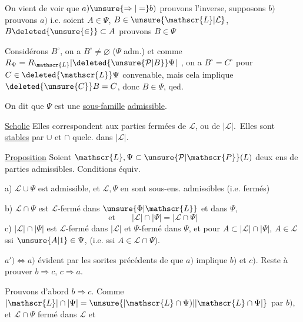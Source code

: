On vient de voir que $a)\unsure{\Rightarrow|=} b)$ prouvons l'inverse, supposons $b)$ prouvons $a)$ i.e. soient $A\in\Psi$, $B\in\unsure{\mathscr{L}|\mathcal{L}}$, $B\deleted{\unsure{\in}}\subset A$ prouvons $B\in\Psi$

Considérons $B^\circ$, on a $B^\circ\ne\varnothing$ ($\Psi$ adm.) et comme $R_\Psi=R_{\mathscr{L}}\lvert\deleted{\unsure{\mathcal{P}|B}}\Psi\rvert$ , on a $B^\circ=C^\circ$ pour $C\in\deleted{\mathscr{L}}\Psi$ convenable, mais cela implique $\deleted{\unsure{C}}B=C$, donc $B\in\Psi$, qed.

On dit que $\Psi$ est une \uline{sous-famille} \uline{admissible}.

\uline{Scholie} Elles correspondent  aux parties fermées de $\mathscr{L}$, ou de $|\mathscr{L}|$. \unsure{\ensuremath{\Rightarrow}|=}\,Elles sont \uline{stables} par $\cup$ et $\cap$ quelc. dans $|\mathscr{L}|$.

\uline{Proposition} Soient $\mathscr{L},\Psi\subset\unsure{\mathcal{P}|\mathscr{P}}(L)$ deux ens de parties admissibles. Conditions équiv.

a) $\mathscr{L}\cup\Psi$ est admissible, et $\mathscr{L},\Psi$ en sont  sous-ens. admissibles (i.e. fermés)

b) $\mathscr{L}\cap\Psi$ est $\mathscr{L}$-fermé dans $\unsure{\Phi|\mathscr{L}}$ et  dans $\Psi$,
\[
 \text{et}\qquad |\mathscr{L}|\cap|\Psi|=|\mathscr{L}\cap\Psi|
\]
c) $|\mathscr{L}|\cap|\Psi|$ est $\mathscr{L}$-fermé dans $|\mathscr{L}|$ et \unsure{\ensuremath{\{}|,} $\Psi$-fermé dans $\Psi$, et  pour $A\subset|\mathscr{L}|\cap|\Psi|$, $A\in\mathscr{L}$  ssi $\unsure{A|1}\in\Psi$, (i.e. ssi $A\in\mathscr{L}\cap\Psi$).


$a')\Leftrightarrow a)$ évident par les sorites précédents de  que $a)$ implique $b)$ et $c)$. Reste à prouver $b\Rightarrow c$, $c\Rightarrow a$.

Prouvons d'abord $b\Rightarrow c$. Comme $|\mathscr{L}|\cap|\Psi|=\unsure{\lvert\mathscr{L}\cap\Psi)|\lvert\mathscr{L}\cap\Psi\rvert}$ par $b)$, et $\mathscr{L}\cap\Psi$ fermé dans $\mathscr{L}$ et
